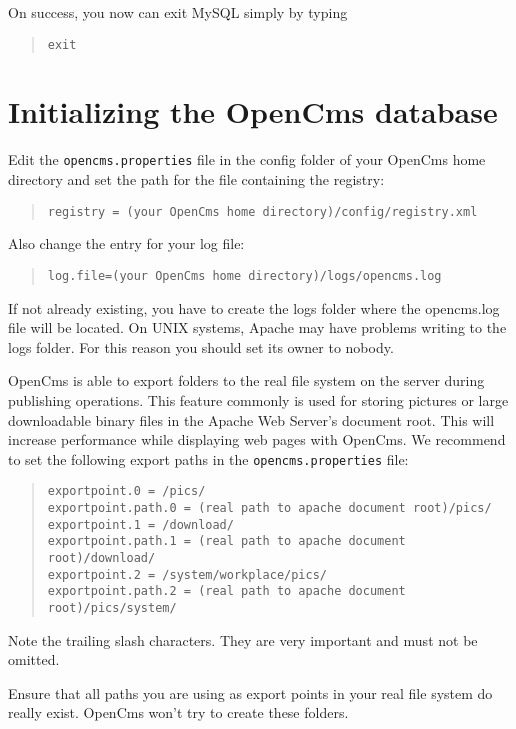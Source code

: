 On success, you now can exit MySQL simply by typing
\begin{quote}
\texttt{exit}
\end{quote}

\section{Initializing the OpenCms database}
Edit the \texttt{opencms.properties} file in the config folder of your OpenCms home 
directory and set the path for the file containing the registry:

\begin{quote}
\texttt{registry = (your OpenCms home directory)/config/registry.xml}
\end{quote}

Also change the entry for your log file:

\begin{quote}
\texttt{log.file=(your OpenCms home directory)/logs/opencms.log}
\end{quote}

If not already existing, you have to create the logs folder where the opencms.log file 
will be located. On UNIX systems, Apache may have problems writing to the logs folder. 
For this reason you should set its owner to nobody. 

OpenCms is able to export folders to the real file system on the server during 
publishing operations. This feature commonly is used for storing pictures or large downloadable
binary files in the Apache Web Server's
document root. This will increase performance while displaying web pages with OpenCms.
We recommend to set the following export paths in the \texttt{opencms.properties} file:

\begin{quote}
\begin{verbatim}
exportpoint.0 = /pics/
exportpoint.path.0 = (real path to apache document root)/pics/
exportpoint.1 = /download/
exportpoint.path.1 = (real path to apache document root)/download/
exportpoint.2 = /system/workplace/pics/
exportpoint.path.2 = (real path to apache document root)/pics/system/
\end{verbatim}
\end{quote}

Note the trailing slash
characters. They are very important and must not be omitted.

Ensure that all paths you are using as export points in your real file system
do really exist. OpenCms won't try to create these folders.

